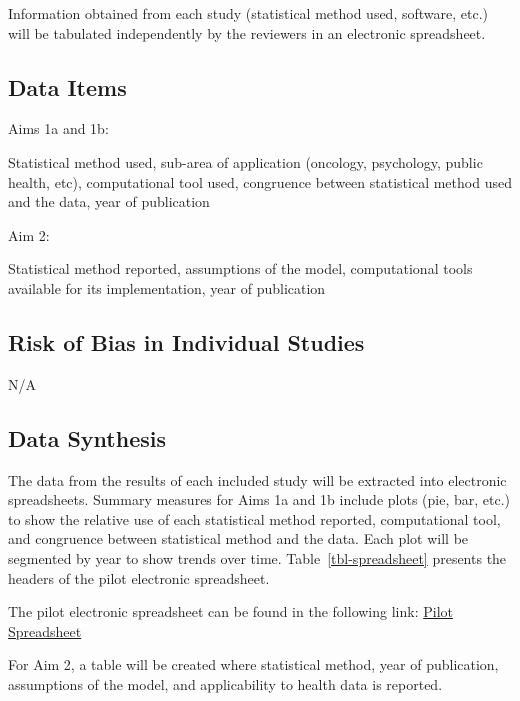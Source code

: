 \documentclass[
]{article}
\begin{document}
Information obtained from each study (statistical method used, software,
etc.) will be tabulated independently by the reviewers in an electronic
spreadsheet.

\hypertarget{data-items}{%
\subsection{Data Items}\label{data-items}}

Aims 1a and 1b:

Statistical method used, sub-area of application (oncology, psychology,
public health, etc), computational tool used, congruence between
statistical method used and the data, year of publication

Aim 2:

Statistical method reported, assumptions of the model, computational
tools available for its implementation, year of publication

\hypertarget{risk-of-bias-in-individual-studies}{%
\subsection{Risk of Bias in Individual
Studies}\label{risk-of-bias-in-individual-studies}}

N/A

\hypertarget{data-synthesis}{%
\subsection{Data Synthesis}\label{data-synthesis}}

The data from the results of each included study will be extracted into
electronic spreadsheets. Summary measures for Aims 1a and 1b include
plots (pie, bar, etc.) to show the relative use of each statistical
method reported, computational tool, and congruence between statistical
method and the data. Each plot will be segmented by year to show trends
over time. Table~\ref{tbl-spreadsheet} presents the headers of the pilot
electronic spreadsheet.

The pilot electronic spreadsheet can be found in the following link:
\href{https://udemontreal-my.sharepoint.com/:x:/g/personal/ariel_mundo_ortiz_umontreal_ca/EUr53h3HnMBLhRohYMqYmp0Bzf1UY7ncKTvm2RkPf9Wt3w?e=cMdhdw}{Pilot Spreadsheet}

For Aim 2, a table will be created where statistical method, year of
publication, assumptions of the model, and applicability to health data
is reported.
\end{document}
